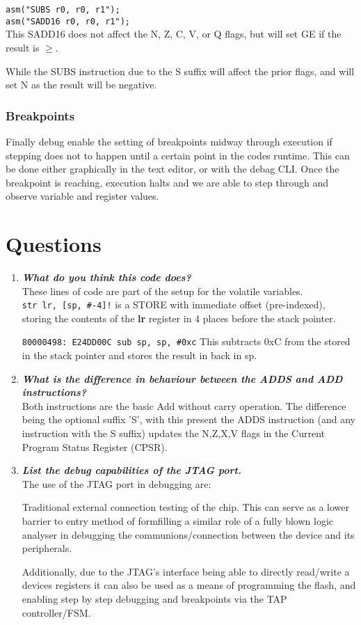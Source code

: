 \documentclass[11pt]{article}
\begin{document}
\begin{preview}
\texttt{asm("SUBS r0, r0, r1");}\\
\texttt{asm("SADD16 r0, r0, r1");}\\


This SADD16 does not affect the N, Z, C, V, or Q flags, but will set GE if the result is $\ge$. 

While the SUBS instruction due to the S suffix will affect the prior flags, and will set N as the result will be negative.

\subsubsection*{Breakpoints}
Finally debug enable the setting of breakpoints midway through execution if stepping does not to happen until a certain point in the codes runtime. This can be done either graphically in the text editor, or with the debag CLI. Once the breakpoint is reaching, execution halts and we are able to step through and observe variable and register values. 

\section{Questions}
\begin{enumerate}
    \item \textbf{\textit{What do you think this code does?}}\\
    These lines of code are part of the setup for the volatile variables.\\
    \texttt{str lr, [sp, \#-4]!} is a STORE with immediate offset (pre-indexed), storing the contents of the \textbf{lr} register in 4 places before the stack pointer.

    \texttt{80000498: E24DD00C sub sp, sp, \#0xc} This subtracts 0xC from the stored in the stack pointer and stores the result in back in sp.

    \item \textbf{\textit{What is the difference in behaviour between the ADDS and ADD instructions?}}\\
    Both instructions are the basic Add without carry operation. The difference being the optional suffix 'S', with this present the ADDS instruction (and any instruction with the S suffix) updates the N,Z,X,V flags in the Current Program Status Register (CPSR).
    \item \textbf{\textit{List the debug capabilities of the JTAG port.}}\\
    The use of the JTAG port in debugging are: 
    
    Traditional external connection testing of the chip. This can serve as a lower barrier to entry method of formfilling a similar role of a fully blown logic analyser in debugging the communions/connection between the device and its peripherals.

    Additionally, due to the JTAG's interface being able to directly read/write a devices registers it can also be used as a means of programming the flash, and enabling step by step debugging and breakpoints via the TAP controller/FSM.
\end{enumerate}
\end{preview}
\end{document}
